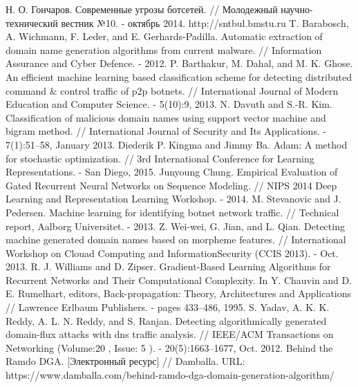 \begingroup
\renewcommand{\section}[2]{\anonsection{Библиографический список}}
\begin{thebibliography}{00}
    Н. О. Гончаров.
    Современные угрозы ботсетей. //
    Молодежный научно-технический вестник №10. - октябрь 2014. http://sntbul.bmstu.ru
	T. Barabosch, A. Wichmann, F. Leder, and E. Gerhards-Padilla.
    Automatic extraction of domain name generation algorithms from current malware. //
    Information Assurance and Cyber Defence. - 2012.
    P. Barthakur, M. Dahal, and M. K. Ghose.
    An efficient machine learning based classification scheme for detecting distributed command \& control traffic of p2p botnets. //
    International Journal of Modern Education and Computer Science. - 5(10):9, 2013.
    N. Davuth and S.-R. Kim.
    Classification of malicious domain names using support vector machine and bigram method. //
    International Journal of Security and Its Applications. - 7(1):51–58, January 2013.
    Diederik P. Kingma and Jimmy Ba.
    Adam: A method for stochastic optimization. //
    3rd International Conference for Learning Representations. - San Diego, 2015.
    Junyoung Chung.
    Empirical Evaluation of Gated Recurrent Neural Networks on Sequence Modeling. //
    NIPS 2014 Deep Learning and Representation Learning Workshop. - 2014.
    M. Stevanovic and J. Pedersen.
    Machine learning for identifying botnet network traffic. //
    Technical report, Aalborg Universitet. - 2013.
    Z. Wei-wei, G. Jian, and L. Qian.
    Detecting machine generated domain names based on morpheme features. //
    International Workshop on Clouad Computing and InformationSecurity (CCIS 2013). - Oct. 2013.
    R. J. Williams and D. Zipser. Gradient-Based Learning Algorithms for Recurrent Networks and Their Computational Complexity. In Y. Chauvin and D. E. Rumelhart, editors, Back-propagation: Theory, Architectures and Applications // Lawrence Erlbaum Publishers. - pages 433–486, 1995.
    S. Yadav, A. K. K. Reddy, A. L. N. Reddy, and S. Ranjan.
    Detecting algorithmically generated domain-flux attacks with dns traffic analysis. //
    IEEE/ACM Transactions on Networking  (Volume:20 ,  Issue: 5 ). - 20(5):1663–1677, Oct. 2012.
    Behind the Ramdo DGA. [Электронный ресурс] // Damballa.
    URL: https://www.damballa.com/behind-ramdo-dga-domain-generation-algorithm/

\end{thebibliography}
